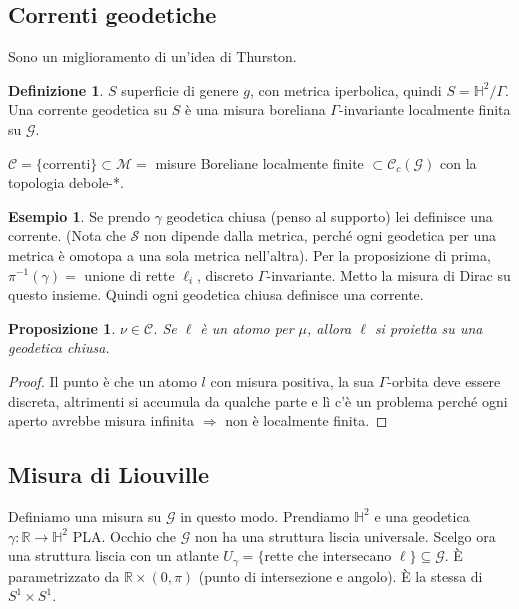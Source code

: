 \documentclass[a4paper]{article}
\newtheorem{proposition}{Proposizione}
\theoremstyle{definition}
\newtheorem{definition}{Definizione}
\newtheorem{example}{Esempio}
\begin{document}
\subsection{Correnti geodetiche}
    Sono un miglioramento di un'idea di Thurston.

    \begin{definition}
        $S$ superficie di genere $g$, con metrica iperbolica, quindi $S = \mathbb H^2 /\Gamma$. Una corrente geodetica su $S$ è una misura boreliana $\Gamma$-invariante localmente finita su $\mathcal G$.
    \end{definition}

    $\mathcal C = \{\textrm{correnti}\} \subset \mathcal M =$ misure Boreliane localmente finite $\subset \mathcal C_{c} (\mathcal G)$ con la topologia debole-*.

    \begin{example}
        Se prendo $\gamma$ geodetica chiusa (penso al supporto) lei definisce una corrente. (Nota che $\mathcal S$ non dipende dalla metrica, perché ogni geodetica per una metrica è omotopa a una sola metrica nell'altra). Per la proposizione di prima, $\pi^{-1}(\gamma) =$ unione di rette $\ell_{i}$, discreto $\Gamma$-invariante. Metto la misura di Dirac su questo insieme. Quindi ogni geodetica chiusa definisce una corrente.
    \end{example}

    \begin{proposition}
        $\nu \in \mathcal C$. Se $\ell$ è un atomo per $\mu$, allora $\ell$ si proietta su una geodetica chiusa.
    \end{proposition}

    \begin{proof}
        Il punto è che un atomo $l$ con misura positiva, la sua $\Gamma$-orbita deve essere discreta, altrimenti si accumula da qualche parte e lì c'è un problema perché ogni aperto avrebbe misura infinita $\Rightarrow$ non è localmente finita.
    \end{proof}

\subsection{Misura di Liouville}

    Definiamo una misura su $\mathcal G$ in questo modo. Prendiamo $\mathbb H^2$ e una geodetica $\gamma: \mathbb R \to \mathbb H^2$ PLA. Occhio che $\mathcal G$ non ha una struttura liscia universale. Scelgo ora una struttura liscia con un atlante $U_{\gamma} = \{\textrm{rette che intersecano }\ell\} \subseteq \mathcal G$. È parametrizzato da $\mathbb R \times (0,\pi)$ (punto di intersezione e angolo). È la stessa di $S^1 \times S^1$.
\end{document}
